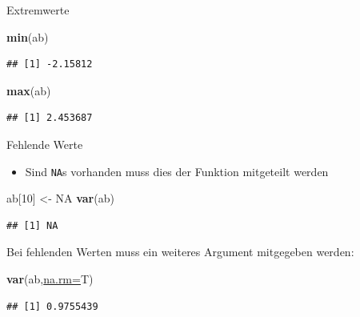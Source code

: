 \documentclass[
  ignorenonframetext,
]{beamer}
\newenvironment{Shaded}{\begin{snugshade}}{\end{snugshade}}
\newcommand{\DataTypeTok}[1]{\textcolor[rgb]{0.74,0.68,0.62}{\underline{#1}}}
\newcommand{\DecValTok}[1]{\textcolor[rgb]{0.27,0.67,0.26}{#1}}
\newcommand{\KeywordTok}[1]{\textcolor[rgb]{0.26,0.66,0.93}{\textbf{#1}}}
\newcommand{\NormalTok}[1]{\textcolor[rgb]{0.74,0.68,0.62}{#1}}
\newcommand{\OtherTok}[1]{\textcolor[rgb]{0.74,0.68,0.62}{#1}}
\newcommand{\StringTok}[1]{\textcolor[rgb]{0.02,0.61,0.04}{#1}}
\providecommand{\tightlist}{%
  \setlength{\itemsep}{0pt}\setlength{\parskip}{0pt}}
\begin{document}
\begin{frame}[fragile]{Extremwerte}
\protect\hypertarget{extremwerte}{}

\begin{Shaded}
\begin{Highlighting}[]
\KeywordTok{min}\NormalTok{(ab)}
\end{Highlighting}
\end{Shaded}

\begin{verbatim}
## [1] -2.15812
\end{verbatim}

\begin{Shaded}
\begin{Highlighting}[]
\KeywordTok{max}\NormalTok{(ab)}
\end{Highlighting}
\end{Shaded}

\begin{verbatim}
## [1] 2.453687
\end{verbatim}

\end{frame}

\begin{frame}[fragile]{Fehlende Werte}
\protect\hypertarget{fehlende-werte}{}

\begin{itemize}
\tightlist
\item
  Sind \texttt{NA}s vorhanden muss dies der Funktion mitgeteilt werden
\end{itemize}

\begin{Shaded}
\begin{Highlighting}[]
\NormalTok{ab[}\DecValTok{10}\NormalTok{] <-}\StringTok{ }\OtherTok{NA}
\KeywordTok{var}\NormalTok{(ab)}
\end{Highlighting}
\end{Shaded}

\begin{verbatim}
## [1] NA
\end{verbatim}

Bei fehlenden Werten muss ein weiteres Argument mitgegeben werden:

\begin{Shaded}
\begin{Highlighting}[]
\KeywordTok{var}\NormalTok{(ab,}\DataTypeTok{na.rm=}\NormalTok{T)}
\end{Highlighting}
\end{Shaded}

\begin{verbatim}
## [1] 0.9755439
\end{verbatim}

\end{frame}
\end{document}

